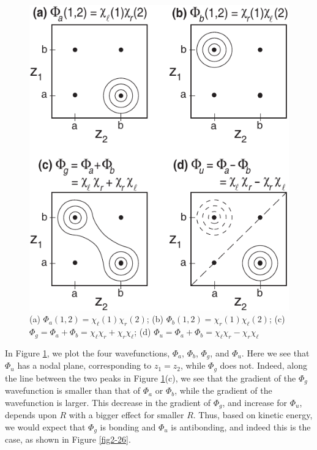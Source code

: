\begin{figure}
\includegraphics[scale=0.75]{fig2-25}
\caption{(a) $\Phi_a(1,2)=\chi_\ell(1)\chi_r(2)$; 
(b) $\Phi_b(1,2)=\chi_r(1) \chi_\ell(2)$;
(c) $\Phi_g=\Phi_a+\Phi_b=\chi_\ell\chi_r+\chi_r\chi_\ell$;
(d) $\Phi_u=\Phi_a+\Phi_b=\chi_\ell\chi_r-\chi_r\chi_\ell$}
\label{fig2-25}
\end{figure}
    
In Figure \ref{fig2-25}, we plot the four wavefunctions, $\Phi_a$,
$\Phi_b$, $\Phi_g$, and $\Phi_u$.  Here we see that $\Phi_u$ has a
nodal plane, corresponding to $z_1 = z_2$, while $\Phi_g$ does
not. Indeed, along the line between the two peaks in Figure
\ref{fig2-25}(c), we see that the gradient of the $\Phi_g$
wavefunction is smaller than that of $\Phi_a$ or $\Phi_b$, while the
gradient of the wavefunction is larger. This decrease in the gradient
of $\Phi_g$, and increase for $\Phi_u$, depends upon $R$ with a bigger
effect for smaller $R$. Thus, based on kinetic energy, we would expect
that $\Phi_g$ is bonding and $\Phi_u$ is antibonding, and indeed this
is the case, as shown in Figure \ref{fig2-26}.

